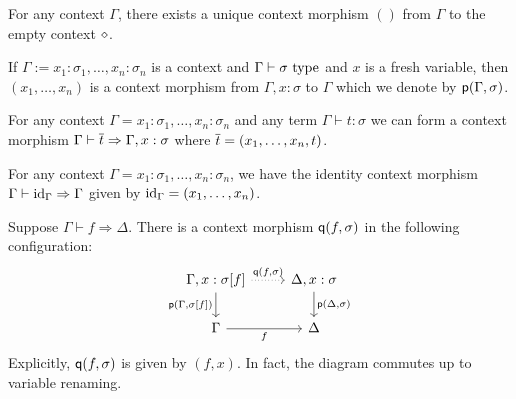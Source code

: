 \documentclass[a4paper]{article}
\begin{document}
\begin{example}
  For any context $\Gamma$, there exists a unique context morphism $()$ from $\Gamma$ to the empty context $\diamond$.
\end{example}

\begin{example}
  If $\Gamma := x_1 : \sigma_1,\ldots,x_{n} : \sigma_n$ is a context and $\Gamma \vdash \sigma~\mathrm{type}$ and $x$ is a fresh variable, then $(x_1,\ldots,x_n)$ is a context morphism from $\Gamma, x : \sigma$ to $\Gamma$ which we denote by $\operatorname{\mathsf{p}}(\Gamma,\sigma)$.
\end{example}

\begin{example}\label{eg:bar}
  For any context $\Gamma = x_1 : \sigma_1,\ldots,x_n : \sigma_n$ and any term $\Gamma \vdash t : \sigma$ we can form a context morphism $\Gamma \vdash \overline{t} \Rightarrow \Gamma, x : \sigma$ where $\overline{t} = (x_1,\ldots,x_n,t)$.
\end{example}

\begin{example}
  For any context $\Gamma = x_1 : \sigma_1,\ldots,x_n : \sigma_n$, we have the identity context morphism $\Gamma \vdash \mathrm{id}_{\Gamma} \Rightarrow \Gamma$ given by $\mathrm{id}_{\Gamma} = (x_1,\ldots,x_n)$.
\end{example}

\begin{example}\label{eg:weak}
  Suppose $\Gamma \vdash f \Rightarrow \Delta$.
  There is a context morphism $\operatorname{\mathsf{q}}(f,\sigma)$ in the following configuration:
  \[\begin{tikzcd}
      {\Gamma,x:\sigma[f]} & {\Delta,x:\sigma} \\
      \Gamma & \Delta
      \arrow["{\ctxWkn(f,\sigma)}", dotted, from=1-1, to=1-2]
      \arrow["{\ctxExt(\Gamma,\sigma[f])}"', from=1-1, to=2-1]
      \arrow["{\ctxExt(\Delta,\sigma)}", from=1-2, to=2-2]
      \arrow["f"', from=2-1, to=2-2]
    \end{tikzcd}\]
  Explicitly, $\operatorname{\mathsf{q}}(f,\sigma)$ is given by $(f, x)$.
  In fact, the diagram commutes up to variable renaming.
\end{example}
\end{document}

